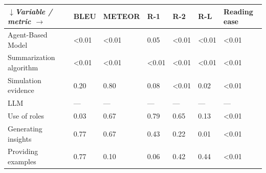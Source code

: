 \begin{tabular}{|l|l|l|l|l|l|l|}
\hline
\textit{$\downarrow$Variable / metric $\rightarrow$} & BLEU & METEOR & R-1 & R-2 & R-L & Reading ease \\
 \hline
 Agent-Based Model & \textless{}0.01 & \textless{}0.01 & 0.05 & \textless{}0.01 & \textless{}0.01 & \textless{}0.01 \\
 \hline
 Summarization algorithm & \textless{}0.01 & \textless{}0.01 & \textless{}0.01 & \textless{}0.01 & \textless{}0.01 & \textless{}0.01 \\
 \hline
 Simulation evidence & 0.20 & 0.80 & 0.08 & \textless{}0.01 & 0.02 & \textless{}0.01 \\
 \hline
 LLM & — & — & — & — & — & — \\
 \hline
 Use of roles & 0.03 & 0.67 & 0.79 & 0.65 & 0.13 & \textless{}0.01 \\
 \hline
 Generating insights & 0.77 & 0.67 & 0.43 & 0.22 & 0.01 & \textless{}0.01 \\
 \hline
 Providing examples & 0.77 & 0.10 & 0.06 & 0.42 & 0.44 & \textless{}0.01 \\
\hline
\end{tabular}
